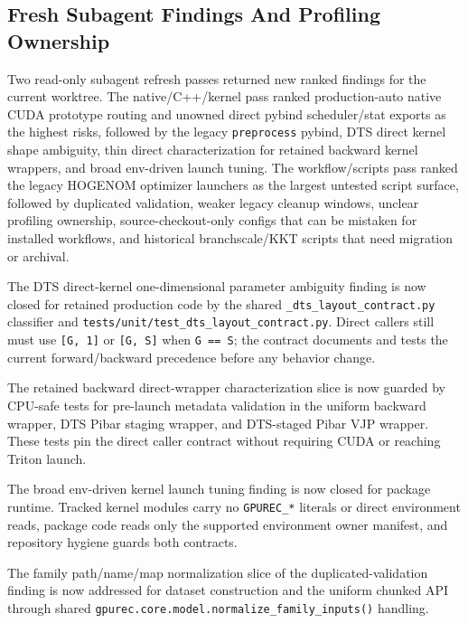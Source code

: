 \documentclass[11pt]{article}
\begin{document}
\subsection{Fresh Subagent Findings And Profiling Ownership}

Two read-only subagent refresh passes returned new ranked findings for the
current worktree.  The native/C++/kernel pass ranked production-auto native
CUDA prototype routing and unowned direct pybind scheduler/stat exports as the
highest risks, followed by the legacy \texttt{preprocess} pybind, DTS direct
kernel shape ambiguity, thin direct characterization for retained backward
kernel wrappers, and broad env-driven launch tuning.  The workflow/scripts pass
ranked the legacy HOGENOM optimizer launchers as the largest untested script
surface, followed by duplicated validation, weaker legacy cleanup windows,
unclear profiling ownership, source-checkout-only configs that can be mistaken
for installed workflows, and historical branchscale/KKT scripts that need
migration or archival.

The DTS direct-kernel one-dimensional parameter ambiguity finding is now closed
for retained production code by the shared
\texttt{\_dts\_layout\_contract.py} classifier and
\texttt{tests/unit/test\_dts\_layout\_contract.py}.  Direct callers still must
use \texttt{[G, 1]} or \texttt{[G, S]} when \texttt{G == S}; the contract
documents and tests the current forward/backward precedence before any behavior
change.

The retained backward direct-wrapper characterization slice is now guarded by
CPU-safe tests for pre-launch metadata validation in the uniform backward
wrapper, DTS Pibar staging wrapper, and DTS-staged Pibar VJP wrapper.  These
tests pin the direct caller contract without requiring CUDA or reaching Triton
launch.

The broad env-driven kernel launch tuning finding is now closed for package
runtime.  Tracked kernel modules carry no \texttt{GPUREC\_*} literals or direct
environment reads, package code reads only the supported environment owner
manifest, and repository hygiene guards both contracts.

The family path/name/map normalization slice of the duplicated-validation
finding is now addressed for dataset construction and the uniform chunked API
through shared \texttt{gpurec.core.model.normalize\_family\_inputs()} handling.
\end{document}
